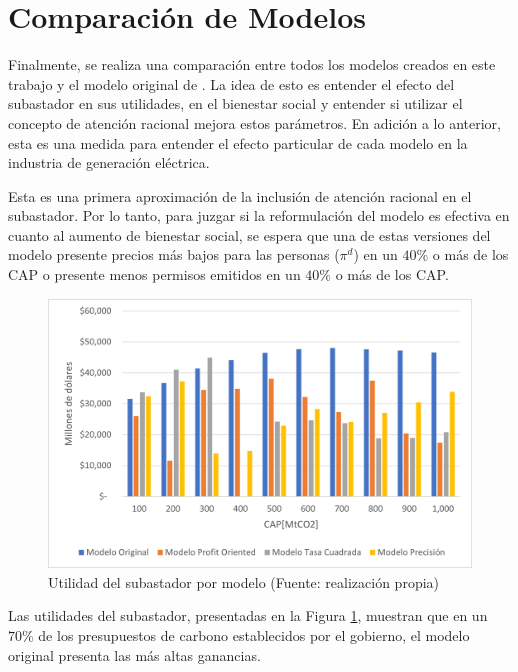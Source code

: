 \section{Comparación de Modelos}

Finalmente, se realiza una comparación entre todos los modelos creados en este trabajo y el modelo original de . La idea de esto es entender el efecto del subastador en sus utilidades,  en el bienestar social y entender si utilizar el concepto de atención racional mejora estos parámetros. En adición a lo anterior, esta es una medida para entender el efecto particular de cada modelo en la industria de generación eléctrica. 
\vspace{2.5mm}

Esta es una primera aproximación de la inclusión de atención racional en el subastador. Por lo tanto, para juzgar si la reformulación del modelo es efectiva en cuanto al aumento de bienestar social, se espera que una de estas versiones del modelo presente precios más bajos para las personas ($\pi^d$) en un $40\%$ o más de los CAP o presente menos permisos emitidos en un $40\%$ o más de los CAP.
\vspace{2.5mm}



\begin{figure}[H]
    \centering
    \includegraphics[width=12cm]{docs/DocumentoMemoria/core/images/utilidad de todos lo modelos.png}
\caption{{\footnotesize Utilidad del subastador por modelo (Fuente: realización propia)}}
    \label{utilidades}
\end{figure}

Las utilidades del subastador, presentadas en la Figura \ref{utilidades}, muestran que en un $70\%$ de los presupuestos de carbono establecidos por el gobierno, el modelo original presenta las más altas ganancias. 
\vspace{2.5mm}

